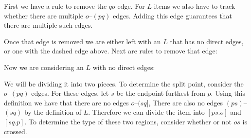 First we have a rule to remove the $qo$ edge.
For $L$ items we also have to track whether there are multiple $o$--$(pq)$ edges.
Adding this edge guarantees that there are multiple such edges.


Once that edge is removed we are either left with an $L$ that has no direct edges, or one with the dashed edge above.
Next are rules to remove that edge:


Now we are considering an $L$ with no direct edges:

\begin{center}
\end{center}

We will be dividing it into two pieces.
To determine the split point, consider the $o$--$(pq)$ edges.
For these edges, let $s$ be the endpoint furthest from $p$.
Using this definition we have that there are no edges $o$--$(sq]$, 
There are also no edges $(ps)$--$(sq)$ by the definition of $L$.
Therefore we can divide the item into $[ps.o]$ and $[sq.p]$.
To determine the type of these two regions, consider whether or not $os$ is crossed.

